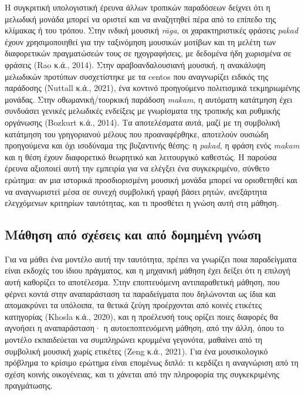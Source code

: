 \documentclass[a4paper]{article}
\begin{document}
Η συγκριτική υπολογιστική έρευνα άλλων τροπικών παραδόσεων δείχνει ότι η μελωδική μονάδα μπορεί να οριστεί και να αναζητηθεί πέρα από το επίπεδο της κλίμακας ή του τρόπου. Στην ινδική μουσική \emph{rāga}, οι χαρακτηριστικές φράσεις \emph{pakad} έχουν χρησιμοποιηθεί για την ταξινόμηση μουσικών μοτίβων και τη μελέτη των διαφορετικών πραγματώσεών τους σε ηχογραφήσεις, με δεδομένα ήδη χωρισμένα σε φράσεις (Rao κ.ά., 2014). Στην αραβοανδαλουσιανή μουσική, η ανακάλυψη μελωδικών προτύπων συσχετίστηκε με τα centos που αναγνωρίζει ειδικός της παράδοσης (Nuttall κ.ά., 2021), ένα κοντινό προηγούμενο πολιτισμικά τεκμηριωμένης μονάδας. Στην οθωμανική/τουρκική παράδοση \emph{makam}, η αυτόματη κατάτμηση έχει συνδυάσει γενικές μελωδικές ενδείξεις με γνωρίσματα της τροπικής και ρυθμικής οργάνωσης (Bozkurt κ.ά., 2014). Τα αποτελέσματα αυτά, μαζί με τη συμβολική κατάτμηση του γρηγοριανού μέλους που προαναφέρθηκε, αποτελούν ουσιώδη προηγούμενα και όχι ισοδύναμα της βυζαντινής θέσης: η \emph{pakad}, η φράση ενός \emph{makam} και η θέση έχουν διαφορετικό θεωρητικό και λειτουργικό καθεστώς. Η παρούσα έρευνα αξιοποιεί αυτή την εμπειρία για να ελέγξει ένα συγκεκριμένο, σύνθετο ερώτημα: αν μια ιστορικά προσδιορισμένη μουσική μονάδα μπορεί να οριοθετηθεί και να αναγνωριστεί μέσα σε συνεχή συμβολική γραφή βάσει ρητών, ανεξάρτητα ελεγχόμενων κριτηρίων ταυτότητας, και τι προσθέτει η γνώση αυτή στη μάθηση.

\subsection{Μάθηση από σχέσεις και από δομημένη γνώση}\label{sec:lit-ml}
Για να μάθει ένα μοντέλο αυτή την ταυτότητα, πρέπει να γνωρίζει ποια παραδείγματα είναι εκδοχές του ίδιου πράγματος, και η μηχανική μάθηση έχει δείξει ότι η επιλογή αυτή καθορίζει το αποτέλεσμα. Στην εποπτευόμενη αντιπαραθετική μάθηση, που φέρνει κοντά στην αναπαράσταση τα παραδείγματα που δηλώνονται ως ίδια και απομακρύνει τα υπόλοιπα, τα θετικά ζεύγη προέρχονται από κοινές ετικέτες κατηγορίας (Khosla κ.ά., 2020), και η προέλευσή τους ορίζει ποιες διαφορές θα αγνοήσει η αναπαράσταση· η αυτοεποπτευόμενη μάθηση, από την άλλη, όπου το μοντέλο εκπαιδεύεται να συμπληρώνει κρυμμένα γεγονότα, μαθαίνει από τη συμβολική μουσική χωρίς ετικέτες (Zeng κ.ά., 2021). Για ένα μουσικολογικό πρόβλημα το κρίσιμο ερώτημα είναι επομένως διπλό: τι κερδίζει η αναγνώριση από τη σχέση κοινής οικογένειας, και τι χάνεται από την πληροφορία της συγκεκριμένης πραγμάτωσης.
\end{document}
